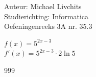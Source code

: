 \documentclass[a4paper]{article}
\begin{document}
  
\noindent \large Auteur: Michael Livchits \\
\noindent \large Studierichting: Informatica\\
\noindent \large Oefeningenreeks 3A nr. 35.3\\

\medskip

\normalsize

$f(x) = 5^{2x-3}$\\

$f'(x) = 5^{2x-3}\cdot2\ln5$

\begin{thebibliography}{999}
\end{thebibliography}
\end{document}
